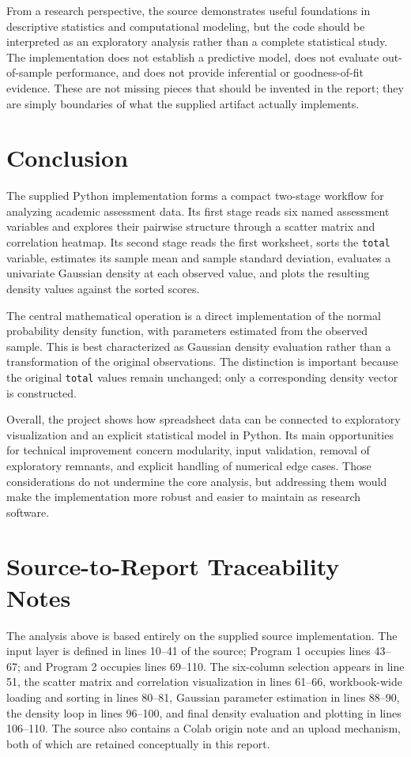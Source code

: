 \documentclass[11pt,a4paper]{article}
\begin{document}
From a research perspective, the source demonstrates useful foundations in descriptive statistics and computational modeling, but the code should be interpreted as an exploratory analysis rather than a complete statistical study. The implementation does not establish a predictive model, does not evaluate out-of-sample performance, and does not provide inferential or goodness-of-fit evidence. These are not missing pieces that should be invented in the report; they are simply boundaries of what the supplied artifact actually implements.

\section{Conclusion}
The supplied Python implementation forms a compact two-stage workflow for analyzing academic assessment data. Its first stage reads six named assessment variables and explores their pairwise structure through a scatter matrix and correlation heatmap. Its second stage reads the first worksheet, sorts the \texttt{total} variable, estimates its sample mean and sample standard deviation, evaluates a univariate Gaussian density at each observed value, and plots the resulting density values against the sorted scores.

The central mathematical operation is a direct implementation of the normal probability density function, with parameters estimated from the observed sample. This is best characterized as Gaussian density evaluation rather than a transformation of the original observations. The distinction is important because the original \texttt{total} values remain unchanged; only a corresponding density vector is constructed.

Overall, the project shows how spreadsheet data can be connected to exploratory visualization and an explicit statistical model in Python. Its main opportunities for technical improvement concern modularity, input validation, removal of exploratory remnants, and explicit handling of numerical edge cases. Those considerations do not undermine the core analysis, but addressing them would make the implementation more robust and easier to maintain as research software.

\section*{Source-to-Report Traceability Notes}
The analysis above is based entirely on the supplied source implementation. The input layer is defined in lines 10--41 of the source; Program 1 occupies lines 43--67; and Program 2 occupies lines 69--110. The six-column selection appears in line 51, the scatter matrix and correlation visualization in lines 61--66, workbook-wide loading and sorting in lines 80--81, Gaussian parameter estimation in lines 88--90, the density loop in lines 96--100, and final density evaluation and plotting in lines 106--110. The source also contains a Colab origin note and an upload mechanism, both of which are retained conceptually in this report.
\end{document}
